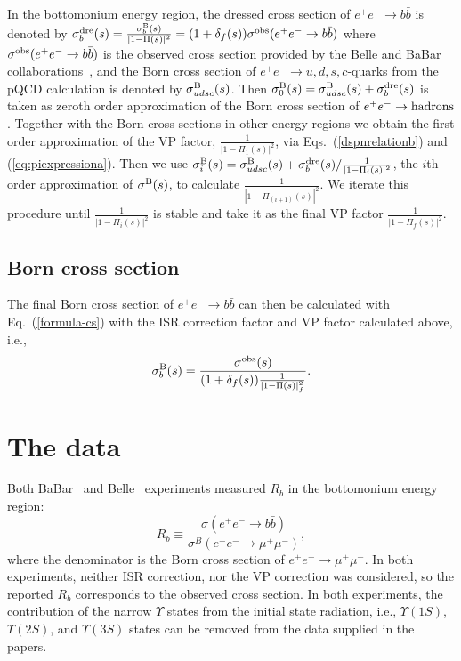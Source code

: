\documentclass[aps,showpacs,superscriptaddress,preprint,tightenlines]{revtex4}
\newcommand{\Rb}{R_b}
\newcommand{\EE}{e^+e^-}
\newcommand{\MM}{\mu^+\mu^-}
\newcommand{\bbb}{b\bar{b}}
\def\eref#1{(\ref{#1})}
\begin{document}
In the bottomonium energy region, the dressed cross section 
of $\EE\to \bbb$ is denoted by 
$\sigma^{\rm dre}_b(s)=\frac{\sigma^{\rm B}_b(s)} {|1-\Pi(s)|^2}=(1+\delta_f(s))\sigma^{\rm{obs}}(\EE\to \bbb)$ 
where $\sigma^{\rm{obs}}(\EE\to \bbb)$ is the observed cross section provided by the Belle and BaBar
collaborations~\cite{babar_rb,belle_rb}, and the Born cross section of $\EE\to u,d,s,c$-quarks 
from the pQCD calculation is denoted by $\sigma_{udsc}^{\rm B}(s)$. 
Then $\sigma_{0}^{\rm B}(s)=\sigma_{udsc}^{\rm B}(s)+\sigma^{\rm dre}_b(s)$ is taken
as zeroth order approximation of the Born cross section of $\EE\to {\rm hadrons}$. 
Together with the Born cross sections in other energy regions we obtain the first order 
approximation of the VP factor,
$\frac{1}{|1-\Pi_1(s)|^2}$, via Eqs.~(\ref{dspnrelationb}) and
(\ref{eq:piexpressiona}). Then we use 
$\sigma_{i}^{\rm B}(s)=\sigma_{udsc}^{\rm B}(s)+\sigma^{\rm dre}_b(s)/\frac{1}{|1-\Pi_i(s)|^2}$,  
the $i$th order approximation of
$\sigma^{\rm B}(s)$, to calculate $\frac{1}{|1-\Pi_{(i+1)}(s)|^2}$. 
We iterate this procedure until
$\frac{1}{|1-\Pi_i(s)|^2}$ is stable and take it as the final 
VP factor $\frac{1}{|1-\Pi_f(s)|^2}$.

\subsection{Born cross section}

The final Born cross section of $\EE\to \bbb$ can then be
calculated with Eq.~\eref{formula-cs} with the ISR correction
factor and VP factor calculated above, i.e.,
\begin{equation}\label{formula-csf}
\sigma_b^{\rm B}(s)=\frac{\sigma^{\rm obs}(s)}
 {(1+\delta_f(s))\frac{1}{|1-\Pi(s)|^{2}_f}}.
\end{equation}

\section{The data}

Both BaBar~\cite{babar_rb} and Belle~\cite{belle_rb} experiments
measured $\Rb$ in the bottomonium energy region: 
$$R_b\equiv \frac{\sigma(\EE\to b\bar{b})}{\sigma^B(\EE\to \MM)},$$
where the denominator is the Born cross section of $\EE\to \MM$.
In both experiments, neither ISR correction,
nor the VP correction was considered, so the reported
$\Rb$ corresponds to the observed cross section. In both
experiments, the contribution of the narrow $\Upsilon$ states
from the initial state radiation, i.e., $\Upsilon(1S)$, 
$\Upsilon(2S)$, and $\Upsilon(3S)$ states can be removed 
from the data supplied in the papers.
\end{document}
